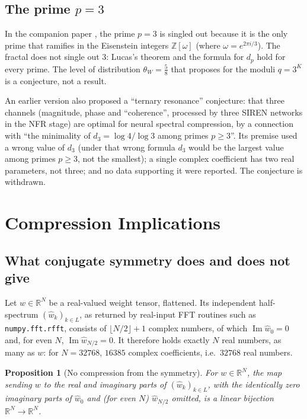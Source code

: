 \documentclass[12pt]{article}
\newtheorem{proposition}[theorem]{Proposition}
\theoremstyle{definition}
\newcommand{\Z}{\mathbb{Z}}
\newcommand{\R}{\mathbb{R}}
\begin{document}
\subsection{The prime $p = 3$}

In the companion paper \cite{Wakil2026Eisenstein}, the prime $p = 3$ is
singled out because it is the only prime that ramifies in the Eisenstein
integers $\Z[\omega]$ (where $\omega = e^{2\pi i/3}$).  The fractal does
not single out $3$: Lucas's theorem and the formula for $d_p$ hold for
every prime.  The level of distribution $\theta_W = \tfrac{5}{8}$ that
\cite{Wakil2026Eisenstein} proposes for the moduli $q = 3^K$ is a
conjecture, not a result.

An earlier version also proposed a ``ternary resonance'' conjecture:
that three channels (magnitude, phase and ``coherence'', processed by
three SIREN networks \cite{Sitzmann2020} in the NFR stage) are optimal
for neural spectral compression, by a connection with ``the minimality
of $d_3 = \log 4/\log 3$ among primes $p \geq 3$''.  Its premise used a
wrong value of $d_3$ (under that wrong formula $d_3$ would be the
largest value among primes $p \geq 3$, not the smallest); a single
complex coefficient has two real parameters, not three; and no data
supporting it were reported.  The conjecture is withdrawn.

\section{Compression Implications}
\label{sec:compression}

\subsection{What conjugate symmetry does and does not give}

Let $w \in \R^N$ be a real-valued weight tensor, flattened.  Its
independent half-spectrum $(\hat{w}_k)_{k \in L}$, as returned by
real-input FFT routines such as \texttt{numpy.fft.rfft}, consists of
$\lfloor N/2 \rfloor + 1$ complex numbers, of which
$\operatorname{Im}\hat{w}_0 = 0$ and, for even $N$,
$\operatorname{Im}\hat{w}_{N/2} = 0$.  It therefore holds exactly $N$
real numbers, as many as $w$: for $N = 32768$, $16385$ complex
coefficients, i.e.\ $32768$ real numbers.

\begin{proposition}[No compression from the symmetry]\label{prop:nocompression}
For $w \in \R^N$, the map sending $w$ to the real and imaginary parts of
$(\hat{w}_k)_{k \in L}$, with the identically zero imaginary parts of
$\hat{w}_0$ and (for even $N$) $\hat{w}_{N/2}$ omitted, is a linear
bijection $\R^N \to \R^N$.
\end{proposition}
\end{document}

